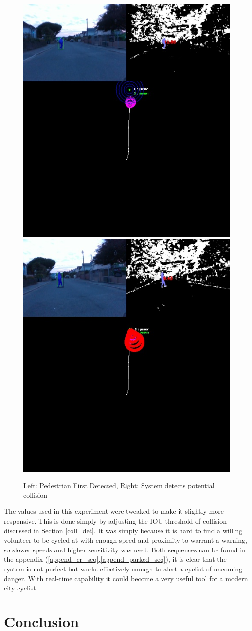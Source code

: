 \documentclass[11pt,twoside]{report}
\begin{document}
\noindent \begin{figure}[h!]
	\includegraphics[width = 0.5\hsize,trim={0 8cm 0 0},clip]{figures/crash_seq_1.jpg}
	\includegraphics[width = 0.5\hsize,trim={0 8cm 0 0},clip]{figures/crash_seq_2.jpg}
	\caption{Left: Pedestrian First Detected, Right: System detects potential collision}
	\label{staged_crash_seq}
\end{figure}

The values used in this experiment were tweaked to make it slightly more responsive. This is done simply by adjusting the IOU threshold of collision discussed in Section \ref{coll_det}. It was simply because it is hard to find a willing volunteer to be cycled at with enough speed and proximity to warrant a warning, so slower speeds and higher sensitivity was used. Both sequences can be found in the appendix (\ref{append_cr_seq},\ref{append_parked_seq}), it is clear that the system is not perfect but works effectively enough to alert a cyclist of oncoming danger. With real-time capability it could become a very useful tool for a modern city cyclist.

\chapter{Conclusion}
\end{document}

